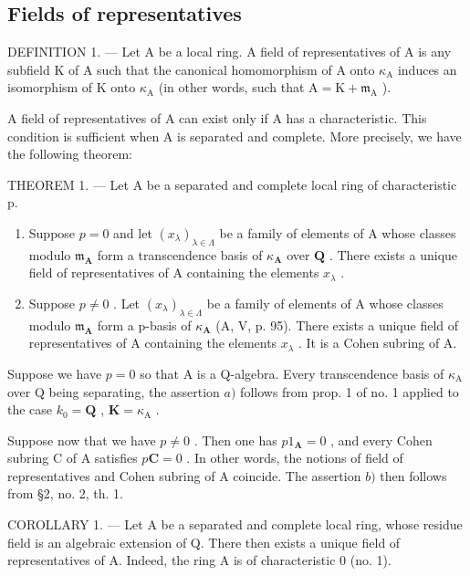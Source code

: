 \subsection{Fields of representatives}

DEFINITION 1. --- Let A be a local ring. A field of representatives of A is any subfield K of A such that the canonical homomorphism of A onto \(\kappa_{\mathrm{A}}\) induces an isomorphism of K onto \(\kappa_{\mathrm{A}}\) (in other words, such that \(\mathrm{A} = \mathrm{K} + \mathfrak{m}_{\mathrm{A}}\) ).

A field of representatives of A can exist only if A has a characteristic. This condition is sufficient when A is separated and complete. More precisely, we have the following theorem:

THEOREM 1. --- Let A be a separated and complete local ring of characteristic p.

\begin{enumerate}
\def\labelenumi{\alph{enumi})}
\item
  Suppose \(p = 0\) and let \((x_{\lambda})_{\lambda \in \Lambda}\) be a family of elements of A whose classes modulo \(\mathfrak{m}_{\mathbf{A}}\) form a transcendence basis of \(\kappa_{\mathbf{A}}\) over \(\mathbf{Q}\) . There exists a unique field of representatives of A containing the elements \(x_{\lambda}\) .
\item
  Suppose \(p \neq 0\) . Let \((x_{\lambda})_{\lambda \in \Lambda}\) be a family of elements of A whose classes modulo \(\mathfrak{m}_{\mathbf{A}}\) form a p-basis of \(\kappa_{\mathbf{A}}\) (A, V, p. 95). There exists a unique field of representatives of A containing the elements \(x_{\lambda}\) . It is a Cohen subring of A.
\end{enumerate}

Suppose we have \(p = 0\) so that A is a Q-algebra. Every transcendence basis of \(\kappa_{\mathrm{A}}\) over Q being separating, the assertion \(a)\) follows from prop. 1 of no. 1 applied to the case \(k_0 = \mathbf{Q}\) , \(\mathbf{K} = \kappa_{\mathrm{A}}\) .

Suppose now that we have \(p \neq 0\) . Then one has \(p1_{\mathbf{A}} = 0\) , and every Cohen subring C of A satisfies \(p\mathbf{C} = 0\) . In other words, the notions of field of representatives and Cohen subring of A coincide. The assertion \(b)\) then follows from §2, no. 2, th. 1.

COROLLARY 1. --- Let A be a separated and complete local ring, whose residue field is an algebraic extension of Q. There then exists a unique field of representatives of A. Indeed, the ring A is of characteristic 0 (no. 1).


